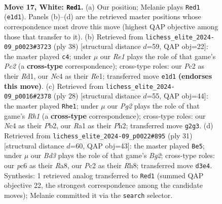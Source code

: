 \documentclass[11pt]{article}
\begin{document}
\clearpage

\begin{figure}[p]\centering
\begin{subfigure}{0.46\textwidth}\centering
\resizebox{\linewidth}{!}{%
\newchessgame
\chessboard[
  setfen={r1b2bnr/p2k2pp/2pp4/5p2/2N2B2/3B1P2/PPP3PP/R3R1K1 w - - 8 17},
  showmover=false,
  pgfstyle=straightmove, color=movearrow, markmove={e1-d1}
]}
\caption{}
\end{subfigure}\hfill
\begin{subfigure}{0.46\textwidth}\centering
\resizebox{\linewidth}{!}{%
\newchessgame
\chessboard[
  setfen={r1b2rk1/ppb3p1/4pn1p/8/1P6/P2B3P/2PB1PP1/3RR1K1 w - - 2 20},
  showmover=false,
  pgfstyle=straightmove, color=movearrow, markmove={c2-c4}
]}
\caption{}
\end{subfigure}
\\[4pt]
\begin{subfigure}{0.46\textwidth}\centering
\resizebox{\linewidth}{!}{%
\newchessgame
\chessboard[
  setfen={1nr4r/1pp1kppp/p2b4/3Pp3/2B5/5N2/PPP2PPP/2KR3R w - - 0 15},
  showmover=false,
  pgfstyle=straightmove, color=movearrow, markmove={h1-e1}
]}
\caption{}
\end{subfigure}\hfill
\begin{subfigure}{0.46\textwidth}\centering
\resizebox{\linewidth}{!}{%
\newchessgame
\chessboard[
  setfen={r6r/pp1k1pbp/3pb3/2p2p2/7N/2P5/PPP3PP/R1B2RK1 b - - 3 16},
  showmover=false,
  pgfstyle=straightmove, color=movearrow, markmove={g7-e5}
]}
\caption{}
\end{subfigure}
\caption{\textbf{Move 17, White: \texttt{Red1}.} (a) Our position; Melanie plays \texttt{Red1} (\texttt{e1d1}). Panels (b)--(d) are the retrieved master positions whose correspondence most drove this move (highest QAP objective among those that transfer to it). (b) Retrieved from \texttt{lichess\_elite\_2024-09\_p0023\#3723} (ply 38) [structural distance $d$=59, QAP obj=22]: the master played \texttt{c4}; under $\mu$ our \emph{Re1} plays the role of that game's \emph{Pc2} (a \textbf{cross-type} correspondence); cross-type roles: our \emph{P}c2 as their \emph{R}d1, our \emph{N}c4 as their \emph{R}e1; transferred move \texttt{e1d1} \textbf{(endorses this move)}. (c) Retrieved from \texttt{lichess\_elite\_2024-09\_p0016\#2378} (ply 28) [structural distance $d$=55, QAP obj=44]: the master played \texttt{Rhe1}; under $\mu$ our \emph{Pg2} plays the role of that game's \emph{Rh1} (a \textbf{cross-type} correspondence); cross-type roles: our \emph{N}c4 as their \emph{P}b2, our \emph{R}a1 as their \emph{P}h2; transferred move \texttt{g2g3}. (d) Retrieved from \texttt{lichess\_elite\_2024-09\_p0022\#895} (ply 31) [structural distance $d$=60, QAP obj=43]: the master played \texttt{Be5}; under $\mu$ our \emph{Bd3} plays the role of that game's \emph{Bg2}; cross-type roles: our \emph{p}c6 as their \emph{R}a8, our \emph{P}c2 as their \emph{R}h8; transferred move \texttt{d3e4}. Synthesis: 1 retrieved analog transferred to \texttt{Red1} (summed QAP objective 22, the strongest correspondence among the candidate moves); Melanie committed it via the \texttt{search} selector.}
\label{fig:thought-m32}
\end{figure}
\end{document}
